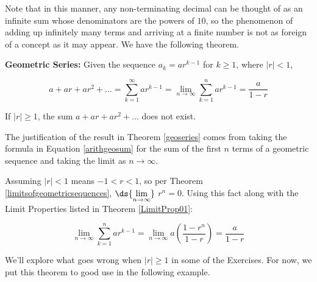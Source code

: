 \documentclass{ximera}
\begin{document}
Note that in this manner, any non-terminating decimal can be thought of as an infinite sum whose denominators are the powers of $10$, so the phenomenon of adding up infinitely many terms and arriving at a finite number is not as foreign of a concept as it may appear. We have the following theorem.

\medskip


\begin{theorem}  \label{geoseries} \textbf{Geometric Series:} Given the sequence $a_{k} = ar^{k-1}$ for $k \geq 1$, where $|r| < 1$,

\[ a + ar + ar^2 + \ldots = \displaystyle{\sum_{k=1}^{\infty} ar^{k-1}} = \displaystyle{\lim_{n \rightarrow \infty} \sum_{k=1}^{n} ar^{k-1}} =  \frac{a}{1-r}\]

If $|r| \geq 1$, the sum $a + ar + ar^2 + \ldots $ does not exist. 

\end{theorem}


 

The justification of the result in Theorem \ref{geoseries} comes from taking the formula in Equation \ref{arithgeosum} for the sum of the first $n$ terms of a geometric sequence and taking the limit as $n \rightarrow \infty$.  

Assuming $|r|<1$ means $-1 < r < 1$, so per Theorem \ref{limitsofgeometricsequences},  $\ds{\lim_{n \rightarrow \infty}}$ $r^{n} =  0$.  Using this fact along with the Limit Properties listed in Theorem \ref{LimitProp01}:

\[\displaystyle{\lim_{n \rightarrow \infty} \sum_{k=1}^{n} a r^{k-1}} = \lim_{n \rightarrow \infty}  a \left( \frac{1-r^n}{1-r}\right) =  \frac{a}{1-r} \]

We'll explore what goes wrong when $|r| \geq 1$ in some of the Exercises. For now, we put this theorem to good use in the following example.
\end{document}
